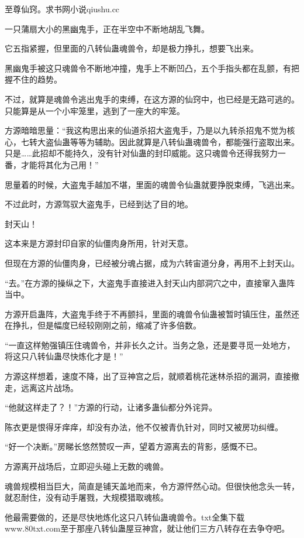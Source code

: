 
\begin{this_body}

至尊仙窍。求书网小说qiushu.cc

一只蒲扇大小的黑幽鬼手，正在半空中不断地胡乱飞舞。

它五指紧握，但里面的八转仙蛊魂兽令，却是极力挣扎，想要飞出来。

黑幽鬼手被这只魂兽令不断地冲撞，鬼手上不断凹凸，五个手指头都在乱颤，有把握不住的趋势。

不过，就算是魂兽令逃出鬼手的束缚，在这方源的仙窍中，也已经是无路可逃的。只能算是从一个小牢笼里，逃到了一座大的牢笼。

方源暗暗思量：“我这构思出来的仙道杀招大盗鬼手，乃是以九转杀招鬼不觉为核心，七转大盗仙蛊等等为辅助。因此就算是八转仙蛊魂兽令，都能强行盗取出来。只是……此招却不能持久，没有针对仙蛊的封印威能。这只魂兽令还得我努力一番，才能将其化为己用！”

思量着的时候，大盗鬼手越加不堪，里面的魂兽令仙蛊就要挣脱束缚，飞逃出来。

不过此时，方源驾驭大盗鬼手，已经到达了目的地。

封天山！

这本来是方源封印自家的仙僵肉身所用，针对天意。

但现在方源的仙僵肉身，已经被分魂占据，成为六转宙道分身，再用不上封天山。

“去。”在方源的操纵之下，大盗鬼手直接进入封天山内部洞穴之中，直接窜入蛊阵当中。

方源开启蛊阵，大盗鬼手终于不再颤抖，里面的魂兽令仙蛊被暂时镇压住，虽然还在挣扎，但是幅度已经较刚刚之前，缩减了许多倍数。

“一直这样勉强镇压住魂兽令，并非长久之计。当务之急，还是要寻觅一处地方，将这只八转仙蛊尽快炼化才是！”

方源这样想着，速度不降，出了豆神宫之后，就顺着桃花迷林杀招的漏洞，直接撤走，远离这片战场。

“他就这样走了？！”方源的行动，让诸多蛊仙都分外诧异。

陈衣更是恨得牙痒痒，却没有办法，他不仅被青仇针对，同时又被房功纠缠。

“好一个决断。”房睇长悠然赞叹一声，望着方源离去的背影，感慨不已。

方源离开战场后，立即迎头碰上无数的魂兽。

魂兽规模相当巨大，简直是铺天盖地而来，令方源怦然心动。但很快他念头一转，就忍耐住，没有动手屠戮，大规模猎取魂核。

他最需要做的，还是尽快地炼化这只八转仙蛊魂兽令。txt全集下载www.80txt.com至于那座八转仙蛊屋豆神宫，就让他们三方八转存在去争夺吧。


\end{this_body}
